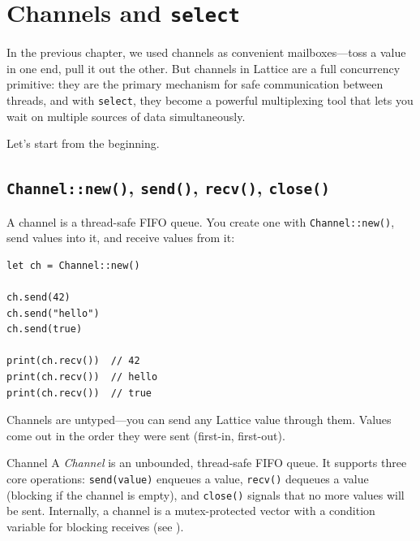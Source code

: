 \chapter{Channels and \texttt{select}}\label{ch:channels-select}


In the previous chapter, we used channels as convenient mailboxes---toss a value in one end, pull it out the other.
But channels in Lattice are a full concurrency primitive: they are the primary mechanism for safe communication between threads, and with \lstinline|select|, they become a powerful multiplexing tool that lets you wait on multiple sources of data simultaneously.

Let's start from the beginning.

\section{\texttt{Channel::new()}, \texttt{send()}, \texttt{recv()}, \texttt{close()}}\label{sec:channel-basics}


A channel is a thread-safe FIFO queue.
You create one with \lstinline|Channel::new()|, send values into it, and receive values from it:

\begin{lstlisting}[language=Lattice, caption={Channel basics}]
let ch = Channel::new()

ch.send(42)
ch.send("hello")
ch.send(true)

print(ch.recv())  // 42
print(ch.recv())  // hello
print(ch.recv())  // true
\end{lstlisting}

Channels are untyped---you can send any Lattice value through them.
Values come out in the order they were sent (first-in, first-out).

\begin{defnbox}{Channel}
A \emph{Channel} is an unbounded, thread-safe FIFO queue.
It supports three core operations: \lstinline|send(value)| enqueues a value, \lstinline|recv()| dequeues a value (blocking if the channel is empty), and \lstinline|close()| signals that no more values will be sent.
Internally, a channel is a mutex-protected vector with a condition variable for blocking receives (see ).
\end{defnbox}

